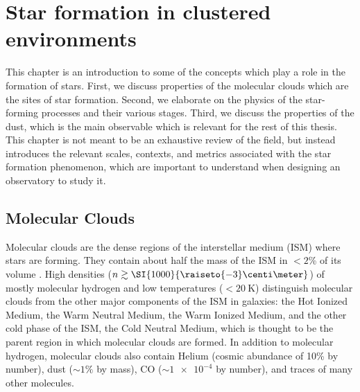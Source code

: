 \chapter{Star formation in clustered environments} %

\label{chap:StarFormation}


This chapter is an introduction to some of the concepts which play a role in the formation of stars. First, we discuss properties of the molecular clouds which are the sites of star formation. Second, we elaborate on the physics of the star-forming processes and their various stages. Third, we discuss the properties of the dust, which is the main observable which is relevant for the rest of this thesis. This chapter is not meant to be an exhaustive review of the field, but instead introduces the relevant scales, contexts, and metrics associated with the star formation phenomenon, which are important to understand when designing an observatory to study it.

\section{Molecular Clouds}

Molecular clouds are the dense regions of the interstellar medium (ISM) where stars are forming. They contain about half the mass of the ISM in $<2$\% of its volume \citep[see][and references therein]{Kennicutt:2012ey}. High densities ($n \gtrsim \SI{1000}{\raiseto{-3}\centi\meter}$) of mostly molecular hydrogen and low temperatures ($< \SI{20}{\kelvin}$) distinguish molecular clouds from the other major components of the ISM in galaxies: the Hot Ionized Medium, the Warm Neutral Medium, the Warm Ionized Medium, and the other cold phase of the ISM, the Cold Neutral Medium, which is thought to be the parent region in which molecular clouds are formed. In addition to molecular hydrogen, molecular clouds also contain Helium (cosmic abundance of 10\% by number), dust ($\sim 1\%$ by mass), CO ($\sim \num{1e-4}$ by number), and traces of many other molecules.

